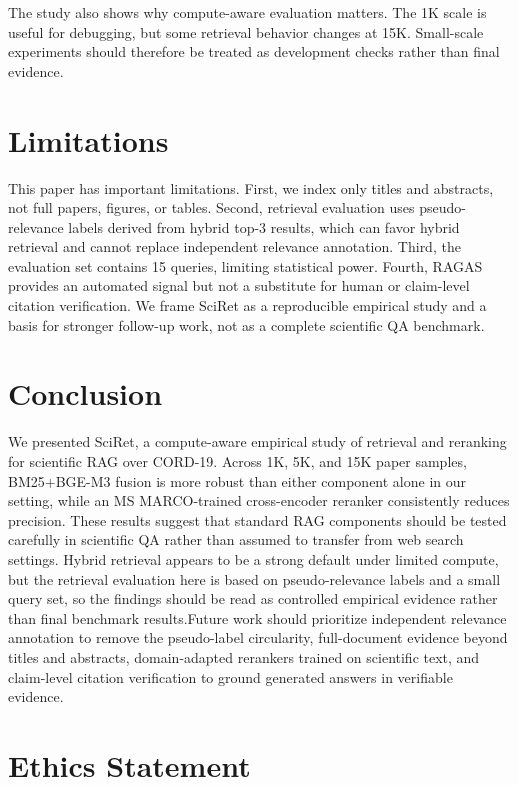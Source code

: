 \documentclass[11pt]{article}
\begin{document}
The study also shows why compute-aware evaluation matters. The 1K scale is useful for debugging, but some retrieval behavior changes at 15K. Small-scale experiments should therefore be treated as development checks rather than final evidence.

\section{Limitations}
\label{sec:limitations}

This paper has important limitations. First, we index only titles and abstracts, not full papers, figures, or tables. Second, retrieval evaluation uses pseudo-relevance labels derived from hybrid top-3 results, which can favor hybrid retrieval and cannot replace independent relevance annotation. Third, the evaluation set contains 15 queries, limiting statistical power. Fourth, RAGAS provides an automated signal but not a substitute for human or claim-level citation verification. We frame SciRet as a reproducible empirical study and a basis for stronger follow-up work, not as a complete scientific QA benchmark.

\section{Conclusion}

We presented SciRet, a compute-aware empirical study of retrieval and reranking for scientific RAG over CORD-19. Across 1K, 5K, and 15K paper samples, BM25+BGE-M3 fusion is more robust than either component alone in our setting, while an MS MARCO-trained cross-encoder reranker consistently reduces precision. These results suggest that standard RAG components should be tested carefully in scientific QA rather than assumed to transfer from web search settings. Hybrid retrieval appears to be a strong default under limited compute, but the retrieval evaluation here is based on pseudo-relevance labels and a small query set, so the findings should be read as controlled empirical evidence rather than final benchmark results.Future work should prioritize independent relevance annotation to remove the pseudo-label circularity, full-document evidence beyond titles and abstracts, domain-adapted rerankers trained on scientific text, and claim-level citation verification to ground generated answers in verifiable evidence.

\section*{Ethics Statement}
\end{document}
